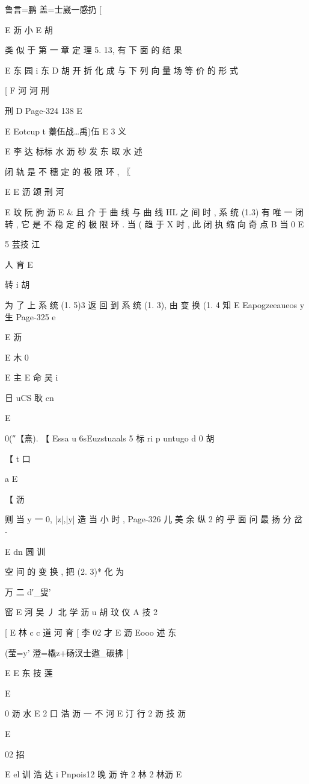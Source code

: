 {{{{{{{{{{{{{{{{{{{鲁言=鹏 盖=士崴一感扔 [

E 沥 小
E 胡

类 似 于 第 一 章 定 理 5. 13, 有 下 面 的 结 果

E 东 园 i 东
D 胡
开 折 化 成 与 下 列 向 量 场 等 价 的 形 式

[
F 河 河 刑

刑
D
Page-324
138 E

E
Eotcup t 蓁伍战…禹)伍 E 3 义

E 李 达 标标 水 沥 砂 发 东 取 水 述

闭 轨 是 不 穗 定 的 极 限 环 , 〖

E E 沥 颂 刑 河

E 玟 阮 朐 沥
E & 且 介 于 曲 线 与 曲 线 HL 之 间 时 , 系 统 (1.3) 有 唯 一 闭 转 , 它
是 不 稳 定 的 极 限 环 . 当 ( 趋 于 X 时 , 此 闭 执 缩 向 奇 点 B 当
0
E

5 芸技 江

人 育
E

转
i 胡

为 了 上 系 统 (1. 5)3 返 回 到 系 统 (1. 3), 由 变 换 (1. 4 知
E
Eapogzeeaueos y 生
Page-325
e

E 沥

E 木
0

E 主
E 命 吴 i

日
uCS 耿 cn

E

0(″【熹). 【
Essa u
6sEuzstuaals 5 标 ri p
untugo d
0 胡

【 t 口

a
E

【
沥

则 当 y 一 0, |z|,|y| 造 当 小 时 ,
Page-326
儿 美 余 纵 2 的 乎 面 问 最 扬 分 岔 -

E dn 圆
训

空 间 的 变 换 , 把 (2. 3)* 化 为

万 二
d′_叟'

窑 E 河 吴 丿 北 学 沥 u 胡 玟 仪 A 技 2

[
E 林 c c 道 河 育 [ 李 02 才
E 沥
Eooo 述 东

(莹=y' 澄=橇z+砀汊士遨_碳拂 [

E
E 东 技 莲

E

0 沥 水
E 2 口 浩 沥 一 不 河
E 汀 行 2 沥 技 沥

E

02 招

E el 训 浩 达 i
Pnpois12 晚 沥 许 2 林 2
林沥
E

}}}}}}}}}}}}}}}}}}}
